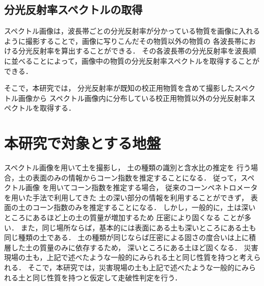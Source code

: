 
\clearpage

\subsection{分光反射率スペクトルの取得}
\label{ssec:SpectrumGet}

スペクトル画像は，波長帯ごとの分光反射率が分かっている物質を画像に入れるように撮影することで，画像に写りこんだその物質以外の物質の
各波長帯における分光反射率を算出することができる．
その各波長帯の分光反射率を波長順に並べることによって，画像中の物質の分光反射率スペクトルを取得することができる．%

そこで，本研究では，
分光反射率が既知の校正用物質を含めて撮影したスペクトル画像から
スペクトル画像内に分布している校正用物質以外の分光反射率スペクトルを取得する．


\clearpage

\section{本研究で対象とする地盤}
\label{sec:Ground}

スペクトル画像を用いて土を撮影し，
土の種類の識別と含水比の推定を
行う場合，土の表面のみの情報からコーン指数を推定することになる．
従って，スペクトル画像
を用いてコーン指数を推定する場合，
従来のコーンペネトロメータを用いた手法で利用してきた
土の深い部分の情報を利用することができず，
表面の土のコーン指数のみを推定することになる．
しかし，一般的に，土は深いところにあるほど上の土の質量が増加するため
圧密により固くなる
ことが多い\cite{森本1975}\cite{高田1983}．
また，同じ場所ならば，基本的には表面にある土も深いところにある土も同じ種類の土である．
土の種類が同じならば圧密による固さの度合いは上に積層した土の質量のみに依存するため，
深いところにある土ほど固くなる．
災害現場の土も，上記で述べたような一般的にみられる土と同じ性質を持つと考えられる．
そこで，本研究では，災害現場の土も上記で述べたような一般的にみられる土と同じ性質を持つと仮定して走破性判定を行う．

